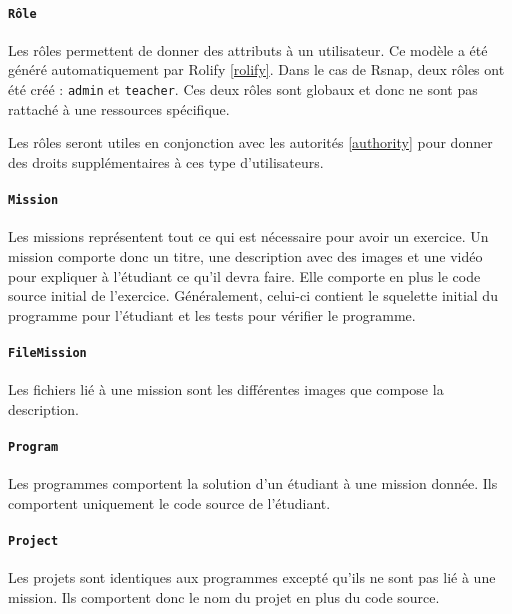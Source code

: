 \paragraph{\texttt{Rôle}} Les rôles permettent de donner des attributs à un utilisateur. Ce modèle a été généré automatiquement par Rolify \ref{rolify}. Dans le cas de Rsnap, deux rôles ont été créé : \texttt{admin} et \texttt{teacher}. Ces deux rôles sont globaux et donc ne sont pas rattaché à une ressources spécifique.%

Les rôles seront utiles en conjonction avec les autorités \ref{authority} pour donner des droits supplémentaires à ces type d'utilisateurs.

\paragraph{\texttt{Mission}} Les missions représentent tout ce qui est nécessaire pour avoir un exercice. Un mission comporte donc un titre, une description avec des images et une vidéo pour expliquer à l'étudiant ce qu'il devra faire. Elle comporte en plus le code source initial de l'exercice. Généralement, celui-ci contient le squelette initial du programme pour l'étudiant et les tests pour vérifier le programme. 

\paragraph{\texttt{FileMission}} Les fichiers lié à une mission sont les différentes images que compose la description. %

\paragraph{\texttt{Program}} Les programmes comportent la solution d'un étudiant à une mission donnée. Ils comportent uniquement le code source de l'étudiant.

\paragraph{\texttt{Project}} Les projets sont identiques aux programmes excepté qu'ils ne sont pas lié à une mission. Ils comportent donc le nom du projet en plus du code source.

